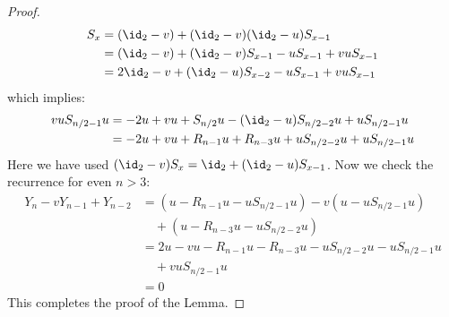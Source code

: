 \begin{proof}
\begin{align*}S_x  &= (\id_2-v)  + (\id_2-v)(\id_2-u) S_{x-1}\\
  &= (\id_2-v)  + (\id_2-v)S_{x-1}  - u S_{x-1} + v u S_{x-1}  
\\
 &= 2\id_2 -v  + (\id_2-u)S_{x-2}  - u S_{x-1} + v u S_{x-1}  
\end{align*} which implies:
\begin{align*} v u S_{n/2-1} u &= - 2u + v u +S_{n/2} u- (\id_2-u) S_{n/2-2} u +u S_{n/2-1}u\\
&= 
-2 u + v u + R_{n-1} u+ R_{n-3}u + u S_{n/2-2} u +u S_{n/2-1}u
\end{align*}
Here we have used $(\id_2-v)S_x = \id_2 + (\id_2-u)S_{x-1}$. Now we check the recurrence for even $n>3$:
\begin{align*}
  Y_n-v Y_{n-1}+Y_{n-2} &= (u - R_{n-1}u - u S_{n/2-1} u) - v (u - u S_{n/2-1} u) \\
  &\quad + (u - R_{n-3}u - u S_{n/2-2} u) \\
  &= 2u -v u - R_{n-1}u -R_{n-3}u - u S_{n/2-2} u- u S_{n/2-1} u  \\
  &\quad + v u S_{n/2-1} u \\
  &= 0 
\end{align*}
This completes the proof of the Lemma.
\end{proof}

